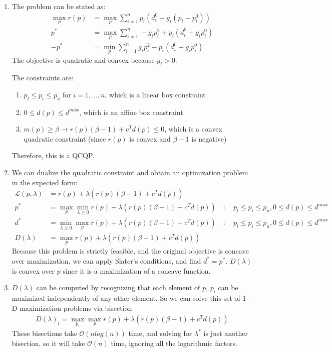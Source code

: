 \documentclass[11pt]{article}
\newcommand{\Lagr}{\mathcal{L}}
\begin{document}
\begin{solution}
\begin{enumerate}
\item The problem can be stated as:
    \begin{align*}
        \max_{p} r(p) &= \max_{p} \sum_{i=1}^n p_i (d_i^0 - g_i(p_i - p_i^0)) \\
        p^* &= \max_{p} \sum_{i=1}^n -g_i p_i^2 + p_i(d_i^0 + g_i p_i^0) \\
        -p^* &= \min_p \sum_{i=1}^n g_i p_i^2 - p_i(d_i^0 + g_i p_i^0)
    \end{align*}
    The objective is quadratic and convex because $g_i > 0$.

    The constraints are:
        \begin{enumerate}
        \item $p_l \leq p_i \leq p_u$ for $i = 1, \dots, n$, which is a linear box constraint
        \item $0 \leq d(p) \leq d^{max}$, which is an affine box constraint
        \item $m(p) \geq \beta \rightarrow r(p)(\beta - 1) + c^T d(p) \leq 0$, which is a convex quadratic constraint (since $r(p)$ is convex and $\beta - 1$ is negative)
        \end{enumerate}
    Therefore, this is a QCQP.

\item We can dualize the quadratic constraint and obtain an optimization problem in the expected form:
    \begin{align*}
        \Lagr(p, \lambda) &= r(p) + \lambda (r(p)(\beta - 1) + c^T d(p)) \\
        p^* &= \max_p \min_{\lambda \geq 0} r(p) + \lambda (r(p)(\beta - 1) + c^T d(p)) \quad : \quad p_l \leq p_i \leq p_u, 0 \leq d(p) \leq d^{max} \\
        d^* &= \min_{\lambda \geq 0} \max_p r(p) + \lambda (r(p)(\beta - 1) + c^T d(p)) \quad : \quad p_l \leq p_i \leq p_u, 0 \leq d(p) \leq d^{max} \\
        D(\lambda) &= \max_p r(p) + \lambda (r(p)(\beta - 1) + c^T d(p))
    \end{align*}
        Because this problem is strictly feasible, and the original objective is concave over maximization, we can apply Slater's conditions, and find $d^* = p^*$. $D(\lambda)$ is convex over $p$ since it is a maximization of a concave function.

\item $D(\lambda)$ can be computed by recognizing that each element of $p$, $p_i$ can be maximized independently of any other element. So we can solve this set of 1-D maximization problems via bisection
    \begin{align*}
        D(\lambda)_i = \max_{p_i} \max_p r(p) + \lambda (r(p)(\beta - 1) + c^T d(p))
    \end{align*}
    These bisections take $\mathcal{O}(n log(n))$ time, and solving for $\lambda^*$ is just another bisection, so it will take $\mathcal{O}(n)$ time, ignoring all the logarithmic factors.


\end{enumerate}
\end{solution}
\end{document}
